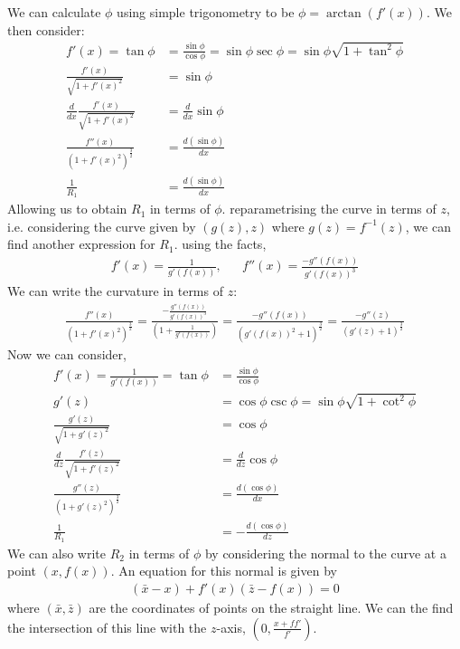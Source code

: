 We can calculate $\phi$ using simple trigonometry to be $\phi=\arctan(f'(x))$. We then consider:
\begin{align}
    f'(x)=\tan \phi &= \frac{\sin\phi}{\cos\phi} 
    =\sin\phi\sec\phi 
    =\sin\phi \sqrt{1+\tan^2\phi}\\
    \frac{f'(x)}{\sqrt{1+f'(x)^2}}&=\sin\phi\\
    \frac{d}{dx} \frac{f'(x)}{\sqrt{1+f'(x)^2}}&=\frac{d}{dx}\sin\phi \\
    \frac{f''(x)}{(1+f'(x)^2)^{\frac{3}{2}}}&=\frac{d(\sin\phi)}{dx} \\
    \frac{1}{R_1}&=\frac{d(\sin\phi)}{dx}
\end{align}
Allowing us to obtain $R_1$ in terms of $\phi$. reparametrising the curve in terms of $z$, i.e. considering the curve given by $(g(z),z)$ where $g(z)=f^{-1}(z)$, we can find another expression for $R_1$. using the facts,
\begin{align}
    f'(x)=\frac{1}{g'(f(x))}, && f''(x) = \frac{-g''(f(x))}{g'(f(x))^3}
\end{align}
We can write the curvature in terms of $z$:
\begin{align}
    \frac{f''(x)}{(1+f'(x)^2)^{\frac{3}{2}}}=\frac{-\frac{g''(f(x))}{g'(f(x))^3}}{(1+\frac{1}{g'(f(x))})} = \frac{-g''(f(x))}{(g'(f(x))^2+1)^{\frac{3}{2}}} = \frac{-g''(z)}{(g'(z)+1)^{\frac{3}{2}}}
\end{align}
Now we can consider,
\begin{align}
    f'(x)=\frac{1}{g'(f(x))}=\tan \phi &= \frac{\sin\phi}{\cos\phi} \\
    g'(z)&=\cos\phi\csc\phi
    =\sin\phi \sqrt{1+\cot^2\phi}\\
    \frac{g'(z)}{\sqrt{1+g'(z)^2}}&=\cos\phi\\
    \frac{d}{dz} \frac{f'(z)}{\sqrt{1+f'(z)^2}}&=\frac{d}{dz}\cos\phi \\
    \frac{g''(z)}{(1+g'(z)^2)^{\frac{3}{2}}}&=\frac{d(\cos\phi)}{dx} \\
    \frac{1}{R_1}&=-\frac{d(\cos\phi)}{dz}
\end{align}
We can also write $R_2$ in terms of $\phi$ by considering the normal to the curve at a point $(x,f(x))$. An equation for this normal is given by
\begin{align}
    (\bar{x}-x) + f'(x)(\bar{z}-f(x))=0
\end{align}
where $(\bar{x},\bar{z})$ are the coordinates of points on the straight line. We can the find the intersection of this line with the $z$-axis, $(0,\frac{x+ff'}{f'})$.
